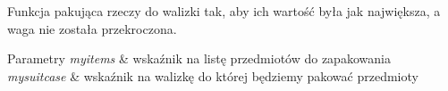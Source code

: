 Funkcja pakująca rzeczy do walizki tak, aby ich wartość była jak największa, a waga nie została przekroczona. 


\begin{DoxyParams}{Parametry}
{\em myitems} & wskaźnik na listę przedmiotów do zapakowania \\
\hline
{\em mysuitcase} & wskaźnik na walizkę do której będziemy pakować przedmioty \\
\hline
\end{DoxyParams}
